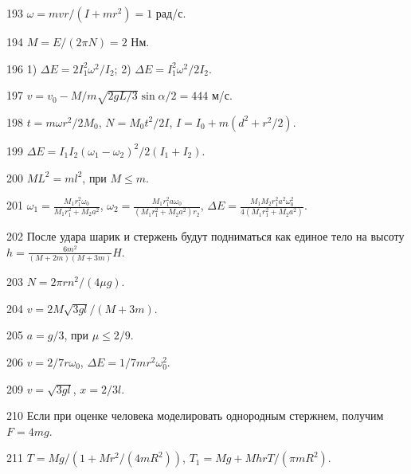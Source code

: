\begin{Answer}{193}
$\omega = mvr/(I+mr^2) = 1$ рад/с.
\end{Answer}
\begin{Answer}{194}
$M = E / (2 \pi N) = 2$ Нм.
\end{Answer}
\begin{Answer}{196}
1) $\Delta E = 2I_1^2\omega^2/I_2$; 2) $\Delta E = I_1^2\omega^2/2I_2$.
\end{Answer}
\begin{Answer}{197}
$v = v_0 -M/m \sqrt{2gL/3} \sin \alpha /2 = 444$ м/с.
\end{Answer}
\begin{Answer}{198}
$t = m\omega r^2 / 2M_0$, $N = M_0t^2/2I$, $I = I_0 + m(d^2 + r^2/2)$.
\end{Answer}
\begin{Answer}{199}
$\Delta E = I_1 I_2 (\omega_1 - \omega_2)^2/ 2(I_1 + I_2)$.
\end{Answer}
\begin{Answer}{200}
$ML^2 = ml^2$, при $M \leq m$.
\end{Answer}
\begin{Answer}{201}
$\omega_1 = \frac{M_1r_1^2\omega_0}{M_1r_1^2 + M_2a^2}$, $\omega_2 = \frac{M_1r_1^2 a \omega_0}{(M_1r_1^2 + M_2a^2)r_2}$, $\Delta E = \frac{M_1 M_2r_1^2a^2\omega_0^2}{4(M_1r_1^2 + M_2a^2)}$.
\end{Answer}
\begin{Answer}{202}
После удара шарик и стержень будут подниматься как единое тело на высоту $h = \frac{6m^2}{(M+2m)(M+3m)}H$.
\end{Answer}
\begin{Answer}{203}
$N = 2\pi r n^2/(4 \mu g)$.
\end{Answer}
\begin{Answer}{204}
$v = 2M\sqrt{3gl}/(M+3m)$.
\end{Answer}
\begin{Answer}{205}
$a = g/3$, при $\mu \leq 2/9$.
\end{Answer}
\begin{Answer}{206}
$v = 2/7r \omega_0$, $\Delta E = 1/7 mr^2 \omega_0^2$.
\end{Answer}
\begin{Answer}{209}
$v = \sqrt{3gl}$, $x = 2/3l$.
\end{Answer}
\begin{Answer}{210}
Если при оценке человека моделировать однородным стержнем, получим $F = 4mg$.
\end{Answer}
\begin{Answer}{211}
$T = Mg/(1 + Mr^2/(4mR^2))$, $T_1 = Mg + MhrT/(\pi m R^2)$.
\end{Answer}
